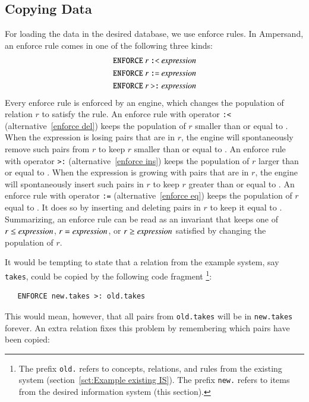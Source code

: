 \documentclass{elsarticle}
\begin{document}
\subsection{Copying Data}
   For loading the data in the desired database, we use enforce rules.
   In Ampersand, an enforce rule comes in one of the following three kinds:
\begin{eqnarray}
   \text{\tt ENFORCE}\ r\ \text{\tt :<}\ \id{expression}\label{enforce del}\\
   \text{\tt ENFORCE}\ r\ \text{\tt :=}\ \id{expression}\label{enforce eq}\\
   \text{\tt ENFORCE}\ r\ \text{\tt >:}\ \id{expression}\label{enforce ins}
\end{eqnarray}
   Every enforce rule is enforced by an engine,
   which changes the population of relation $r$ to satisfy the rule.
   An enforce rule with operator {\tt :<} (alternative~\ref{enforce del}) keeps the population of $r$ smaller than or equal to .
   When the expression is losing pairs that are in $r$, the engine will spontaneously remove such pairs from $r$ to keep $r$ smaller than or equal to .
   An enforce rule with operator {\tt >:} (alternative~\ref{enforce ins}) keeps the population of $r$ larger than or equal to .
   When the expression is growing with pairs that are in $r$, the engine will spontaneously insert such pairs in $r$ to keep $r$ greater than or equal to .
   An enforce rule with operator {\tt :=} (alternative~\ref{enforce eq}) keeps the population of $r$ equal to .
   It does so by inserting and deleting pairs in $r$ to keep it equal to .
   Summarizing, an enforce rule can be read as an invariant that keeps one of $r\leq\text{\it expression\/}$, $r=\text{\it expression\/}$, or $r\geq\text{\it expression\/}$ satisfied by changing the population of $r$.

   It would be tempting to state that a relation from the example system, say {\tt takes}, could be copied by the following code fragment%
\footnote{The prefix {\tt old.} refers to concepts, relations, and rules from the existing system (section~\ref{sct:Example existing IS}).
The prefix {\tt new.} refers to items from the desired information system (this section).}:
\begin{verbatim}
   ENFORCE new.takes >: old.takes
\end{verbatim}
   This would mean, however, that all pairs from {\tt old.takes} will be in {\tt new.takes} forever.
   An extra relation fixes this problem by remembering which pairs have been copied:
\end{document}
